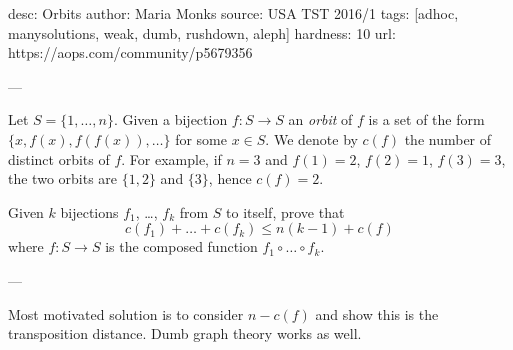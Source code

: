 desc:  Orbits
author: Maria Monks
source:  USA TST 2016/1
tags:  [adhoc, manysolutions, weak, dumb, rushdown, aleph]
hardness: 10
url: https://aops.com/community/p5679356

---

Let $S = \{1, \dots, n\}$.
Given a bijection $f \colon S \to S$ an \emph{orbit} of $f$ is a
set of the form $\{x, f(x), f(f(x)), \dots \}$ for some $x \in S$.
We denote by $c(f)$ the number of distinct orbits of $f$.
For example, if $n=3$ and $f(1)=2$, $f(2)=1$, $f(3)=3$,
the two orbits are $\{1,2\}$ and $\{3\}$, hence $c(f)=2$.

Given $k$ bijections $f_1$, \dots, $f_k$ from $S$ to itself, prove that
\[ c(f_1) + \dots + c(f_k) \le n(k-1) + c(f) \]
where $f \colon S \to S$ is the composed function $f_1 \circ \dots \circ f_k$.

---

Most motivated solution is to consider $n - c(f)$ and show this is the transposition distance.
Dumb graph theory works as well.
